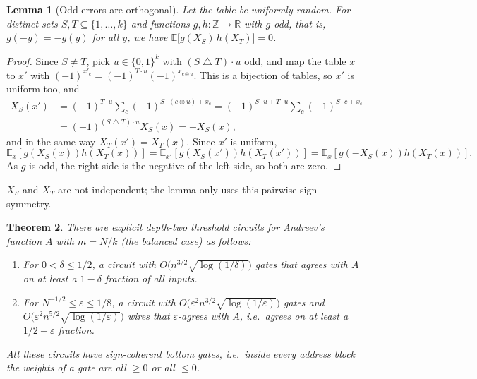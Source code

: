 \documentclass[11pt,letterpaper]{article}
\newtheorem{theorem}{Theorem}
\newtheorem{lemma}[theorem]{Lemma}
\theoremstyle{remark}
\newcommand{\bits}{\{0,1\}}
\begin{document}
\begin{lemma}[Odd errors are orthogonal]\label{lem:odd}
Let the table be uniformly random. For distinct sets $S,T\subseteq\{1,\dots,k\}$ and functions
$g,h:\mathbb Z\to\mathbb R$ with $g$ odd, that is, $g(-y)=-g(y)$ for all $y$, we have
$\mathbb E\bigl[g(X_S)\,h(X_T)\bigr]=0$.
\end{lemma}
\begin{proof}
Since $S\ne T$, pick $u\in\bits^k$ with $(S\mathbin\triangle T)\cdot u$ odd,
and map the table $x$ to $x'$ with $(-1)^{x'_c}=(-1)^{T\cdot u}(-1)^{x_{c\oplus u}}$.
This is a bijection of tables, so $x'$ is uniform too, and
\begin{align*}
X_S(x')
 &=(-1)^{T\cdot u}\sum_{c}(-1)^{S\cdot(c\oplus u)+x_c}
  =(-1)^{S\cdot u+T\cdot u}\sum_{c}(-1)^{S\cdot c+x_c}\\
 &=(-1)^{(S\mathbin\triangle T)\cdot u}X_S(x)=-X_S(x),
\end{align*}
and in the same way $X_T(x')=X_T(x)$. Since $x'$ is uniform,
\[
\mathbb E_x[g(X_S(x))h(X_T(x))]=\mathbb E_{x'}[g(X_S(x'))h(X_T(x'))]
=\mathbb E_x[g(-X_S(x))h(X_T(x))].
\]
As $g$ is odd, the right side is the negative of the left side, so both are zero.
\end{proof}
$X_S$ and $X_T$ are not independent; the lemma only uses this
pairwise sign symmetry.

\begin{theorem}\label{thm:avgupper}
There are explicit depth-two threshold circuits for Andreev's function $A$
with $m=N/k$ (the balanced case) as follows:
\begin{enumerate}
\item For $0<\delta\le1/2$, a circuit with $O\bigl(n^{3/2}\sqrt{\log(1/\delta)}\bigr)$
      gates that agrees with $A$ on at least a $1-\delta$ fraction of all inputs.
\item For $N^{-1/2}\le\varepsilon\le1/8$, a circuit with
      $O\bigl(\varepsilon^2n^{3/2}\sqrt{\log(1/\varepsilon)}\bigr)$ gates and
      $O\bigl(\varepsilon^2n^{5/2}\sqrt{\log(1/\varepsilon)}\bigr)$ wires that
      $\varepsilon$-agrees with $A$, i.e.\ agrees on at least a $1/2+\varepsilon$ fraction.
\end{enumerate}
All these circuits have sign-coherent bottom gates, i.e.\
inside every address block the weights of a gate are all $\ge0$ or all
$\le0$.
\end{theorem}
\end{document}

